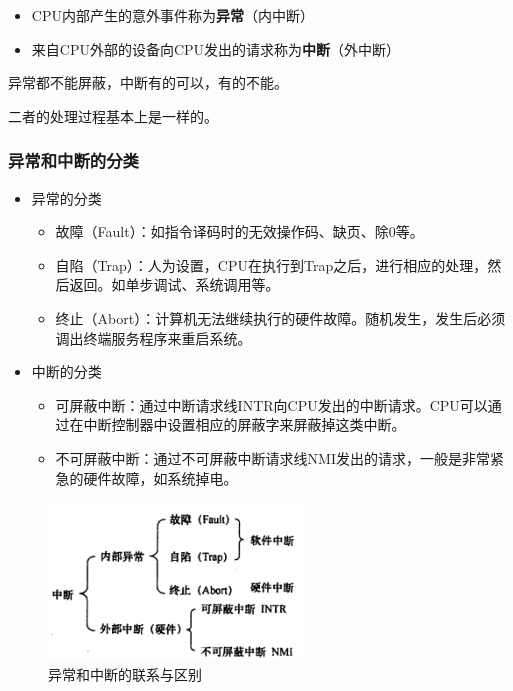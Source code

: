 \documentclass[12pt, a4paper, oneside]{ctexart}
\begin{document}
\begin{itemize}
  \item CPU内部产生的意外事件称为\textbf{异常}（内中断）
  \item 来自CPU外部的设备向CPU发出的请求称为\textbf{中断}（外中断）
\end{itemize}

异常都不能屏蔽，中断有的可以，有的不能。

二者的处理过程基本上是一样的。

\subsubsection{异常和中断的分类}

\begin{itemize}
  \item 异常的分类
  \begin{itemize}
    \item 故障（Fault）：如指令译码时的无效操作码、缺页、除0等。
    \item 自陷（Trap）：人为设置，CPU在执行到Trap之后，进行相应的处理，然后返回。如单步调试、系统调用等。
    \item 终止（Abort）：计算机无法继续执行的硬件故障。随机发生，发生后必须调出终端服务程序来重启系统。
  \end{itemize}
  \item 中断的分类
  \begin{itemize}
    \item 可屏蔽中断：通过中断请求线INTR向CPU发出的中断请求。CPU可以通过在中断控制器中设置相应的屏蔽字来屏蔽掉这类中断。
    \item 不可屏蔽中断：通过不可屏蔽中断请求线NMI发出的请求，一般是非常紧急的硬件故障，如系统掉电。
  \end{itemize}
\end{itemize}

\begin{figure}
  \centering
  \includegraphics[width=0.6\textwidth]{./images/interrupt.png}
  \caption{异常和中断的联系与区别}
\end{figure}
\end{document}
